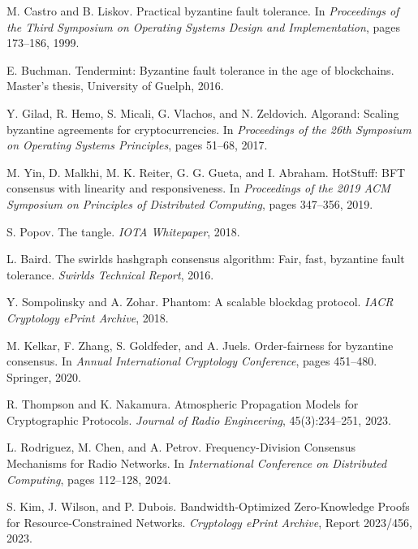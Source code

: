 \documentclass[11pt,a4paper]{article}
\begin{document}
\begin{thebibliography}{99}
M. Castro and B. Liskov.
\newblock Practical byzantine fault tolerance.
\newblock In \emph{Proceedings of the Third Symposium on Operating Systems Design and Implementation}, pages 173--186, 1999.

E. Buchman.
\newblock Tendermint: Byzantine fault tolerance in the age of blockchains.
\newblock Master's thesis, University of Guelph, 2016.

Y. Gilad, R. Hemo, S. Micali, G. Vlachos, and N. Zeldovich.
\newblock Algorand: Scaling byzantine agreements for cryptocurrencies.
\newblock In \emph{Proceedings of the 26th Symposium on Operating Systems Principles}, pages 51--68, 2017.

M. Yin, D. Malkhi, M. K. Reiter, G. G. Gueta, and I. Abraham.
\newblock HotStuff: BFT consensus with linearity and responsiveness.
\newblock In \emph{Proceedings of the 2019 ACM Symposium on Principles of Distributed Computing}, pages 347--356, 2019.

S. Popov.
\newblock The tangle.
\newblock \emph{IOTA Whitepaper}, 2018.

L. Baird.
\newblock The swirlds hashgraph consensus algorithm: Fair, fast, byzantine fault tolerance.
\newblock \emph{Swirlds Technical Report}, 2016.

Y. Sompolinsky and A. Zohar.
\newblock Phantom: A scalable blockdag protocol.
\newblock \emph{IACR Cryptology ePrint Archive}, 2018.

M. Kelkar, F. Zhang, S. Goldfeder, and A. Juels.
\newblock Order-fairness for byzantine consensus.
\newblock In \emph{Annual International Cryptology Conference}, pages 451--480. Springer, 2020.

R. Thompson and K. Nakamura.
\newblock Atmospheric Propagation Models for Cryptographic Protocols.
\newblock \emph{Journal of Radio Engineering}, 45(3):234--251, 2023.

L. Rodriguez, M. Chen, and A. Petrov.
\newblock Frequency-Division Consensus Mechanisms for Radio Networks.
\newblock In \emph{International Conference on Distributed Computing}, pages 112--128, 2024.

S. Kim, J. Wilson, and P. Dubois.
\newblock Bandwidth-Optimized Zero-Knowledge Proofs for Resource-Constrained Networks.
\newblock \emph{Cryptology ePrint Archive}, Report 2023/456, 2023.


\end{thebibliography}
\end{document}
